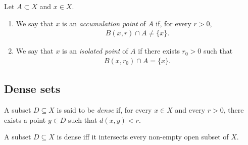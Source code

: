 \documentclass{article}
\begin{document}
\begin{definition}
    Let $A\subset X$ and $x\in X$.
    \begin{enumerate}
        \item We say that $x$ is an \emph{accumulation point} of $A$ if, for every $r>0$,
              \begin{align*}
                  B(x,r)\cap A\not=\{x\}.
              \end{align*}
        \item We say that $x$ is an \emph{isolated point} of $A$ if there exists $r_0>0$
              such that \begin{align*}
                  B(x,r_0)\cap A = \{x\}.
              \end{align*}
    \end{enumerate}
\end{definition}

\subsection{Dense sets}

\begin{definition}
    A subset $D\subseteq X$ is said to be \emph{dense} if, for every $x\in X$
    and every $r>0$, there exists a point $y\in D$ such that $d(x,y)<r$.
\end{definition}

\begin{proposition}[Notes 4.33]
    A subset $D\subseteq X$ is dense iff it intersects every non-empty open
    subset of $X$.
\end{proposition}
\end{document}
